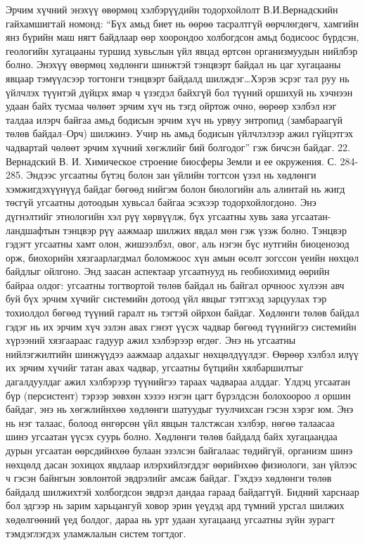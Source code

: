 Эрчим хүчний энэхүү өвөрмөц хэлбэрүүдийн тодорхойлолт В.И.Вернадскийн гайхамшигтай номонд: “Бүх амьд биет нь өөрөө тасралтгүй өөрчлөгдөгч, хамгийн янз бүрийн маш нягт байдлаар өөр хоорондоо холбогдсон амьд бодисоос бүрдсэн, геологийн хугацааны туршид хувьслын үйл явцад өртсөн организмуудын нийлбэр болно. Энэхүү өвөрмөц хөдлөнги шинжтэй тэнцвэрт байдал нь цаг хугацааны явцаар тэмүүлсээр тогтонги тэнцвэрт байдалд шилждэг…Хэрэв эсрэг тал руу нь үйлчлэх түүнтэй дүйцэх ямар ч үзэгдэл байхгүй бол түүний оршихуй нь хэчнээн удаан байх тусмаа чөлөөт эрчим хүч нь тэгд ойртож очно, өөрөөр хэлбэл нэг талдаа илэрч байгаа амьд бодисын эрчим хүч нь урвуу энтропид (замбараагүй төлөв байдал–Орч) шилжинэ. Учир нь амьд бодисын үйлчлэлээр ажил гүйцэтгэх чадвартай чөлөөт эрчим хүчний хөгжлийг бий болгодог” гэж бичсэн байдаг. 22. Вернадский В. И. Химическое строение биосферы Земли и ее окружения. С. 284-285.
Эндээс угсаатны бүтэц болон зан үйлийн тогтсон үзэл нь хөдлөнги хэмжигдэхүүнүүд байдаг бөгөөд нийгэм болон биологийн аль алинтай нь жигд төсгүй угсаатны дотоодын хувьсал байгаа эсэхээр тодорхойлогдоно.
Энэ дүгнэлтийг этнологийн хэл рүү хөрвүүлж, бүх угсаатны хувь заяа угсаатан-ландшафтын тэнцвэр рүү аажмаар шилжих явдал мөн гэж үзэж болно. Тэнцвэр гэдэгт угсаатны хамт олон, жишээлбэл, овог, аль нэгэн бүс нутгийн биоценозод орж, биохорийн хязгаарлагдмал боломжоос хүн амын өсөлт зогссон үеийн нөхцөл байдлыг ойлгоно. Энд заасан аспектаар угсаатнууд нь геобиохимид өөрийн байраа олдог: угсаатны тогтвортой төлөв байдал нь байгал орчноос хүлээн авч буй бүх эрчим хүчийг системийн дотоод үйл явцыг тэтгэхэд зарцуулах тэр тохиолдол бөгөөд түүний гаралт нь тэгтэй ойрхон байдаг. Хөдлөнги төлөв байдал гэдэг нь их эрчим хүч эзлэн авах гэнэт үүсэх чадвар бөгөөд түүнийгээ системийн хүрээний хязгаараас гадуур ажил хэлбэрээр өгдөг. Энэ нь угсаатны нийлэгжилтийн шинжүүдээ аажмаар алдахыг нөхцөлдүүлдэг. Өөрөөр хэлбэл илүү их эрчим хүчийг татан авах чадвар, угсаатны бүтцийн хялбаршилтыг дагалдуулдаг ажил хэлбэрээр түүнийгээ тараах чадвараа алддаг.
Үлдэц угсаатан бүр (персистент) тэрээр зөвхөн хэзээ нэгэн цагт бүрэлдсэн болохоороо л оршин байдаг, энэ нь хөгжлийнхөө хөдлөнги шатуудыг туулчихсан гэсэн хэрэг юм. Энэ нь нэг талаас, болоод өнгөрсөн үйл явцын талстжсан хэлбэр, нөгөө талаасаа шинэ угсаатан үүсэх суурь болно. Хөдлөнги төлөв байдалд байх хугацаандаа дурын угсаатан өөрсдийнхөө булаан эзэлсэн байгалаас төдийгүй, организм шинэ нөхцөлд дасан зохицох явдлаар илэрхийлэгддэг өөрийнхөө физиологи, зан үйлээс ч гэсэн байнгын зовлонтой эвдрэлийг амсаж байдаг.
Гэхдээ хөдлөнги төлөв байдалд шилжихтэй холбогдсон эвдрэл дандаа гараад байдаггүй. Бидний харснаар бол эдгээр нь зарим харьцангуй ховор эрин үеүдэд ард түмний урсгал шилжих хөдөлгөөний үед болдог, дараа нь урт удаан хугацаанд угсаатны зүйн зурагт тэмдэглэгдэх уламжлалын систем тогтдог.
